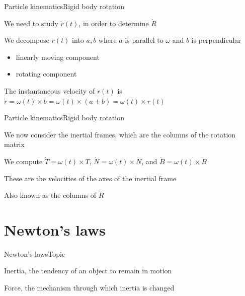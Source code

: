 \documentclass{beamer}
\begin{document}
\begin{slide}{Particle kinematics}{Rigid body rotation}{
\item We need to study $\dot r(t)$, in order to determine $\dot R$
\item We decompose $r(t)$ into $a,b$ where $a$ is parallel to $\omega$ and $b$ is perpendicular
\begin{itemize}
\item linearly moving component
\item rotating component
\end{itemize}
\item The instantaneous velocity of $r(t)$ is $\dot r = \omega(t) \times b = \omega(t) \times (a+b) = \omega(t) \times r(t)$
}\end{slide}


\begin{slide}{Particle kinematics}{Rigid body rotation}{
\item We now consider the inertial frames, which are the columns of the rotation matrix
\item We compute $\dot T = \omega(t) \times T$, $\dot N = \omega(t) \times N$, and $\dot B = \omega(t) \times B$
\item These are the velocities of the axes of the inertial frame
\item Also known as the columns of $\dot R$
}\end{slide}

\section{Newton's laws}
\begin{slide}{Newton's laws}{Topic}{
\item Inertia, the tendency of an object to remain in motion
\item Force, the mechanism through which inertia is changed
}\end{slide}


\end{document}
